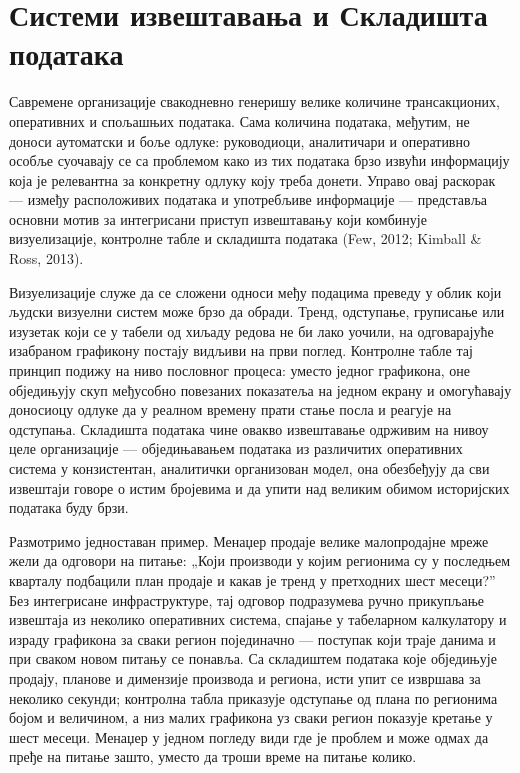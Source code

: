 
\chapter{Системи извештавања и Складишта података}
\label{ch:skladista}
Савремене организације свакодневно генеришу велике количине трансакционих, оперативних и спољашњих података. Сама количина података, међутим, не доноси аутоматски и боље одлуке: руководиоци, аналитичари и оперативно особље суочавају се са проблемом како из тих података брзо извући информацију која је релевантна за конкретну одлуку коју треба донети. Управо овај раскорак — између расположивих података и употребљиве информације — представља основни мотив за интегрисани приступ извештавању који комбинује визуелизације, контролне табле и складишта података (Few, 2012; Kimball \& Ross, 2013).

Визуелизације служе да се сложени односи међу подацима преведу у облик који људски визуелни систем може брзо да обради. Тренд, одступање, груписање или изузетак који се у табели од хиљаду редова не би лако уочили, на одговарајуће изабраном графикону постају видљиви на први поглед. Контролне табле тај принцип подижу на ниво пословног процеса: уместо једног графикона, оне обједињују скуп међусобно повезаних показатеља на једном екрану и омогућавају доносиоцу одлуке да у реалном времену прати стање посла и реагује на одступања. Складишта података чине овакво извештавање одрживим на нивоу целе организације — обједињавањем података из различитих оперативних система у конзистентан, аналитички организован модел, она обезбеђују да сви извештаји говоре о истим бројевима и да упити над великим обимом историјских података буду брзи.

Размотримо једноставан пример. Менаџер продаје велике малопродајне мреже жели да одговори на питање: „Који производи у којим регионима су у последњем кварталу подбацили план продаје и какав је тренд у претходних шест месеци?” Без интегрисане инфраструктуре, тај одговор подразумева ручно прикупљање извештаја из неколико оперативних система, спајање у табеларном калкулатору и израду графикона за сваки регион појединачно — поступак који траје данима и при сваком новом питању се понавља. Са складиштем података које обједињује продају, планове и димензије производа и региона, исти упит се извршава за неколико секунди; контролна табла приказује одступање од плана по регионима бојом и величином, а низ малих графикона уз сваки регион показује кретање у шест месеци. Менаџер у једном погледу види где је проблем и може одмах да пређе на питање зашто, уместо да троши време на питање колико.


